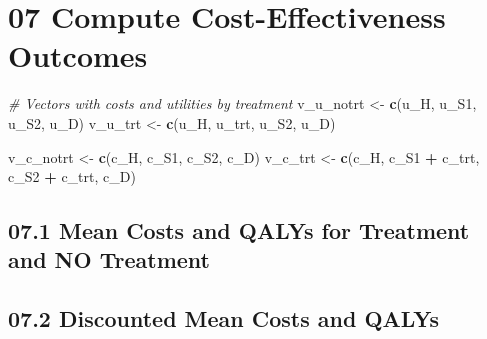 \documentclass[
]{article}
\newenvironment{Shaded}{\begin{snugshade}}{\end{snugshade}}
\newcommand{\CommentTok}[1]{\textcolor[rgb]{0.56,0.35,0.01}{\textit{#1}}}
\newcommand{\KeywordTok}[1]{\textcolor[rgb]{0.13,0.29,0.53}{\textbf{#1}}}
\newcommand{\NormalTok}[1]{#1}
\newcommand{\OperatorTok}[1]{\textcolor[rgb]{0.81,0.36,0.00}{\textbf{#1}}}
\newcommand{\StringTok}[1]{\textcolor[rgb]{0.31,0.60,0.02}{#1}}
\begin{document}
\hypertarget{compute-cost-effectiveness-outcomes}{%
\section{07 Compute Cost-Effectiveness
Outcomes}\label{compute-cost-effectiveness-outcomes}}

\begin{Shaded}
\begin{Highlighting}[]
\CommentTok{# Vectors with costs and utilities by treatment}
\NormalTok{v_u_notrt  <-}\StringTok{ }\KeywordTok{c}\NormalTok{(u_H, u_S1, u_S2, u_D)}
\NormalTok{v_u_trt    <-}\StringTok{ }\KeywordTok{c}\NormalTok{(u_H, u_trt, u_S2, u_D)}

\NormalTok{v_c_notrt  <-}\StringTok{ }\KeywordTok{c}\NormalTok{(c_H, c_S1, c_S2, c_D)}
\NormalTok{v_c_trt    <-}\StringTok{ }\KeywordTok{c}\NormalTok{(c_H, c_S1 }\OperatorTok{+}\StringTok{ }\NormalTok{c_trt, c_S2 }\OperatorTok{+}\StringTok{ }\NormalTok{c_trt, c_D)}
\end{Highlighting}
\end{Shaded}

\hypertarget{mean-costs-and-qalys-for-treatment-and-no-treatment}{%
\subsection{07.1 Mean Costs and QALYs for Treatment and NO
Treatment}\label{mean-costs-and-qalys-for-treatment-and-no-treatment}}

\begin{Shaded}
\end{Shaded}

\hypertarget{discounted-mean-costs-and-qalys}{%
\subsection{07.2 Discounted Mean Costs and
QALYs}\label{discounted-mean-costs-and-qalys}}
\end{document}
